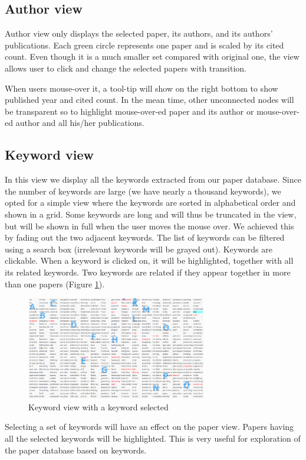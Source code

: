 \subsection{Author view}

Author view only displays the selected paper, its authors, and its authors' publications. Each green circle represents one paper and is scaled by its cited count.  Even though it is a much smaller set compared with original one, the view allows user to click and change the selected papers with transition. 

When users mouse-over it, a tool-tip will show on the right bottom to show published year and cited count. In the mean time, other unconnected nodes will be transparent so to highlight mouse-over-ed paper and its author or  mouse-over-ed author and all his/her publications.

\subsection{Keyword view}
In this view we display all the keywords extracted from our paper database. Since the number of keywords are large (we have nearly a thousand keywords), we opted for a simple view where the keywords are sorted in alphabetical order and shown in a grid. Some keywords are long and will thus be truncated in the view, but will be shown in full when the user moves the mouse over. We achieved this by fading out the two adjacent keywords. The list of keywords can be filtered using a search box (irrelevant keywords will be grayed out). Keywords are clickable. When a keyword is clicked on, it will be highlighted, together with all its related keywords. Two keywords are related if they appear together in more than one papers (Figure \ref{fig:kw_selected}).

\begin{figure}[ht]			
    \centering
    \includegraphics[width=0.7\textwidth]{keyword_view_selected.png}
    \caption{Keyword view with a keyword selected}
    \label{fig:kw_selected}
\end{figure}

Selecting a set of keywords will have an effect on the paper view. Papers having all the selected keywords will be highlighted. This is very useful for exploration of the paper database based on keywords.
